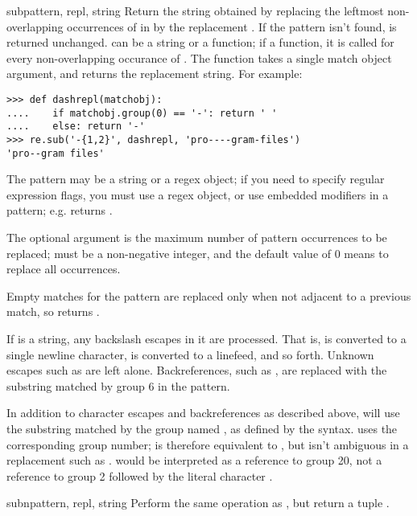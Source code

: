 \begin{funcdesc}{sub}{pattern, repl, string}
Return the string obtained by replacing the leftmost non-overlapping
occurrences of  in  by the replacement
.  If the pattern isn't found,  is returned
unchanged.   can be a string or a function; if a function,
it is called for every non-overlapping occurance of .
The function takes a single match object argument, and returns the
replacement string.  For example:
%
\begin{verbatim}
>>> def dashrepl(matchobj):
....    if matchobj.group(0) == '-': return ' '
....    else: return '-'
>>> re.sub('-{1,2}', dashrepl, 'pro----gram-files')
'pro--gram files'
\end{verbatim}
%
The pattern may be a string or a 
regex object; if you need to specify
regular expression flags, you must use a regex object, or use
embedded modifiers in a pattern; e.g.
 returns .

The optional argument  is the maximum number of pattern
occurrences to be replaced;  must be a non-negative integer, and
the default value of 0 means to replace all occurrences.

Empty matches for the pattern are replaced only when not adjacent to a
previous match, so  returns .

If  is a string, any backslash escapes in it are processed.
That is,  is converted to a single newline character,
 is converted to a linefeed, and so forth.  Unknown escapes
such as  are left alone.  Backreferences, such as , are
replaced with the substring matched by group 6 in the pattern. 

In addition to character escapes and backreferences as described
above,  will use the substring matched by the group
named , as defined by the  syntax.
 uses the corresponding group number;  is therefore equivalent to , but isn't ambiguous in a
replacement such as .   would be
interpreted as a reference to group 20, not a reference to group 2
followed by the literal character .  
\end{funcdesc}

\begin{funcdesc}{subn}{pattern, repl, string}
Perform the same operation as , but return a tuple
.
\end{funcdesc}

